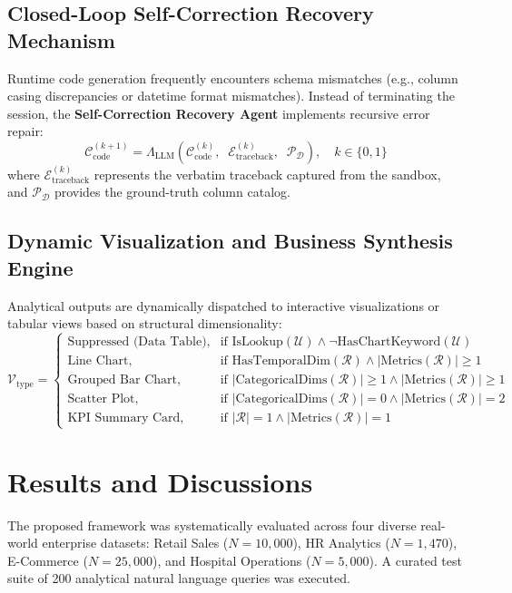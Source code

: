 \documentclass[conference]{IEEEtran}
\begin{document}
\subsection{Closed-Loop Self-Correction Recovery Mechanism}
Runtime code generation frequently encounters schema mismatches (e.g., column casing discrepancies or datetime format mismatches). Instead of terminating the session, the \textbf{Self-Correction Recovery Agent} implements recursive error repair:
\begin{equation}
\mathcal{C}_{\text{code}}^{(k+1)} = \Lambda_{\text{LLM}}\left( \mathcal{C}_{\text{code}}^{(k)}, \;\; \mathcal{E}_{\text{traceback}}^{(k)}, \;\; \mathcal{P}_{\mathcal{D}} \right), \quad k \in \{0, 1\}
\end{equation}
where $\mathcal{E}_{\text{traceback}}^{(k)}$ represents the verbatim traceback captured from the sandbox, and $\mathcal{P}_{\mathcal{D}}$ provides the ground-truth column catalog.

\subsection{Dynamic Visualization and Business Synthesis Engine}
Analytical outputs are dynamically dispatched to interactive visualizations or tabular views based on structural dimensionality:
\begin{equation}
\mathcal{V}_{\text{type}} = \begin{cases}
\text{Suppressed (Data Table)}, & \text{if } \text{IsLookup}(\mathcal{U}) \land \neg \text{HasChartKeyword}(\mathcal{U}) \\
\text{Line Chart}, & \text{if } \text{HasTemporalDim}(\mathcal{R}) \land |\text{Metrics}(\mathcal{R})| \ge 1 \\
\text{Grouped Bar Chart}, & \text{if } |\text{CategoricalDims}(\mathcal{R})| \ge 1 \land |\text{Metrics}(\mathcal{R})| \ge 1 \\
\text{Scatter Plot}, & \text{if } |\text{CategoricalDims}(\mathcal{R})| = 0 \land |\text{Metrics}(\mathcal{R})| = 2 \\
\text{KPI Summary Card}, & \text{if } |\mathcal{R}| = 1 \land |\text{Metrics}(\mathcal{R})| = 1
\end{cases}
\end{equation}

\section{Results and Discussions}
The proposed framework was systematically evaluated across four diverse real-world enterprise datasets: Retail Sales ($N = 10,000$), HR Analytics ($N = 1,470$), E-Commerce ($N = 25,000$), and Hospital Operations ($N = 5,000$). A curated test suite of 200 analytical natural language queries was executed.
\end{document}
